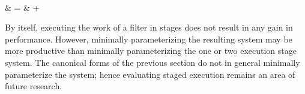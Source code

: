  \\
 & = & 
 +  
\doneeqnstar

    By itself, executing the work of a filter in stages does not
result in any gain in performance. However, minimally
parameterizing the resulting system may be more productive than
minimally parameterizing the one or two execution stage system.
The canonical forms of the previous section do not in general
minimally parameterize the system; hence evaluating staged
execution remains an area of future research.

